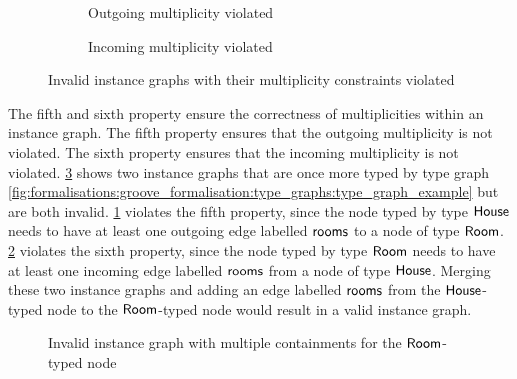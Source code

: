 \begin{figure}[p]
    \centering
    \begin{subfigure}{0.45\textwidth}
        \centering
        
        \caption{Outgoing multiplicity violated}
        \label{fig:formalisations:groove_formalisation:instance_graphs:property_5_violated}
    \end{subfigure}
    \begin{subfigure}{0.45\textwidth}
        \centering
        
        \caption{Incoming multiplicity violated}
        \label{fig:formalisations:groove_formalisation:instance_graphs:property_6_violated}
    \end{subfigure}
    \caption{Invalid instance graphs with their multiplicity constraints violated}
    \label{fig:formalisations:groove_formalisation:instance_graphs:properties_56_violated}
\end{figure}

The fifth and sixth property ensure the correctness of multiplicities within an instance graph. The fifth property ensures that the outgoing multiplicity is not violated. The sixth property ensures that the incoming multiplicity is not violated. \cref{fig:formalisations:groove_formalisation:instance_graphs:properties_56_violated} shows two instance graphs that are once more typed by type graph \cref{fig:formalisations:groove_formalisation:type_graphs:type_graph_example} but are both invalid. \cref{fig:formalisations:groove_formalisation:instance_graphs:property_5_violated} violates the fifth property, since the node typed by type $\mathsf{House}$ needs to have at least one outgoing edge labelled $\mathsf{rooms}$ to a node of type $\mathsf{Room}$. \cref{fig:formalisations:groove_formalisation:instance_graphs:property_6_violated} violates the sixth property, since the node typed by type $\mathsf{Room}$ needs to have at least one incoming edge labelled $\mathsf{rooms}$ from a node of type $\mathsf{House}$. Merging these two instance graphs and adding an edge labelled $\mathsf{rooms}$ from the $\mathsf{House}$-typed node to the $\mathsf{Room}$-typed node would result in a valid instance graph.

\begin{figure}[p]
    \centering
    
    \caption{Invalid instance graph with multiple containments for the $\mathsf{Room}$-typed node}
    \label{fig:formalisations:groove_formalisation:instance_graphs:property_7_violated}
\end{figure}

